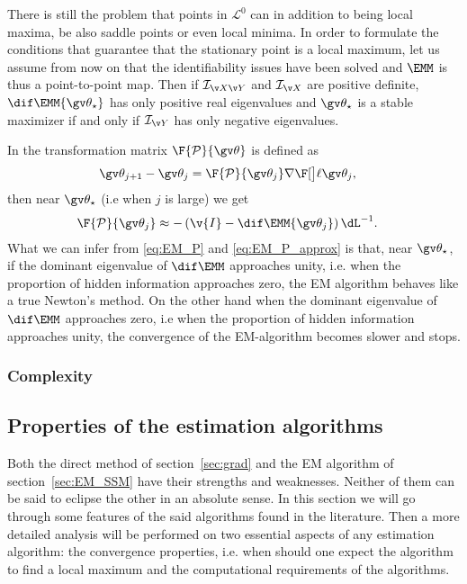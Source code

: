 There is still the problem that points in $\mathcal{L}^0$ can in addition
to being local maxima, be also saddle points or even local minima. In order to formulate
the conditions that guarantee that the stationary point is a local maximum, let us assume
from now on that the identifiability issues have been solved and $\EMM$ is thus a point-to-point map.
Then if $\mathcal{I}_{\X\Y}$ and $\mathcal{I}_{\X}$ are positive definite,
$\dif\EMM{\Th_\star}$ has only positive real eigenvalues and $\Th_\star$ is a
stable maximizer if and only if $\mathcal{I}_{\Y}$ has only negative eigenvalues.

In \textcite{Salakhutdinov2003,Salakhutdinov2004} the transformation matrix $\F{\mathcal P}{\Th}$ is defined as
\begin{align}
	\Th_{j+1}-\Th_j &= \F{\mathcal P}{\Th_j}\nabla\lLH[\Th_j],
	\label{eq:EM_P}
\end{align}
then near $\Th_\star$ (i.e when $j$ is large)
we get
\begin{align}
		\F{\mathcal P}{\Th_j}&\approx -\left(\v{I}-\dif\EMM{\Th_j}\right)\dL^{-1}.
		\label{eq:EM_P_approx}
\end{align}
What we can infer from \eqref{eq:EM_P} and \eqref{eq:EM_P_approx} is that, near $\Th_\star$, if the dominant eigenvalue
of $\dif\EMM$ approaches unity, i.e. when the proportion of hidden information approaches zero, the EM algorithm behaves like 
a true Newton's method. On the other hand when the dominant 
eigenvalue of $\dif\EMM$ approaches zero, i.e when the proportion of hidden information approaches unity, the convergence 
of the EM-algorithm becomes slower and stops. 


\parencite{Wu1983,Sandell1978,Meng1997,Elliott1999,Salakhutdinov2003a,Salakhutdinov2003,Olsson2007,Paninski2010}

\subsubsection{Complexity}

\parencite{Harvey1990,Watson1983,Cappe2005,Saatci2011,Olsson2007,Salakhutdinov2003a}


\subsection{Properties of the estimation algorithms}

Both the direct method of section~\ref{sec:grad} and the EM algorithm of section~\ref{sec:EM_SSM}
have their strengths and weaknesses. Neither of them can be said to eclipse the other in an absolute sense.
In this section we will go through some features of the said algorithms found in the literature.
Then a more detailed analysis will be performed on two essential aspects of any estimation algorithm:
the convergence properties, i.e. when should one expect the algorithm to find a local maximum and
the computational requirements of the algorithms.

